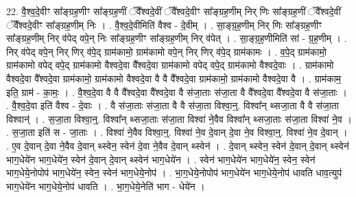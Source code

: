 \documentclass[17pt]{extarticle}
\begin{document}
22. वै॒श्व॒दे॒वीꣳ सा᳚ङ्ग्रह॒णीꣳ सा᳚ङ्ग्रह॒णीं ॅवै᳚श्वदे॒वीं ॅवै᳚श्वदे॒वीꣳ सा᳚ङ्ग्रह॒णीम् निर् णिः सा᳚ङ्ग्रह॒णीं ॅवै᳚श्वदे॒वीं ॅवै᳚श्वदे॒वीꣳ सा᳚ङ्ग्रह॒णीम् निः । . वै॒श्व॒दे॒वीमिति॑ वैश्व - दे॒वीम् । . सा॒ङ्ग्र॒ह॒णीम् निर् णिः सा᳚ङ्ग्रह॒णीꣳ सा᳚ङ्ग्रह॒णीम् निर् व॑पेद् वपे॒न् निः सा᳚ङ्ग्रह॒णीꣳ सा᳚ङ्ग्रह॒णीम् निर् व॑पेत् । . सा॒ङ्ग्र॒ह॒णीमिति॑ सां - ग्र॒ह॒णीम् । . निर् व॑पेद् वपे॒न् निर् णिर् व॑पे॒द् ग्राम॑कामो॒ ग्राम॑कामो वपे॒न् निर् णिर् व॑पे॒द् ग्राम॑कामः । . व॒पे॒द् ग्राम॑कामो॒ ग्राम॑कामो वपेद् वपे॒द् ग्राम॑कामो वैश्वदे॒वा वै᳚श्वदे॒वा ग्राम॑कामो वपेद् वपे॒द् ग्राम॑कामो वैश्वदे॒वाः । . ग्राम॑कामो वैश्वदे॒वा वै᳚श्वदे॒वा ग्राम॑कामो॒ ग्राम॑कामो वैश्वदे॒वा वै वै वै᳚श्वदे॒वा ग्राम॑कामो॒ ग्राम॑कामो वैश्वदे॒वा वै । . ग्राम॑काम॒ इति॒ ग्राम॑ - का॒मः॒ । . वै॒श्व॒दे॒वा वै वै वै᳚श्वदे॒वा वै᳚श्वदे॒वा वै स॑जा॒ताः स॑जा॒ता वै वै᳚श्वदे॒वा वै᳚श्वदे॒वा वै स॑जा॒ताः । . वै॒श्व॒दे॒वा इति॑ वैश्व - दे॒वाः । . वै स॑जा॒ताः स॑जा॒ता वै वै स॑जा॒ता विश्वा॒न्॒. विश्वा᳚न् थ्सजा॒ता वै वै स॑जा॒ता विश्वान्॑ । . स॒जा॒ता विश्वा॒न्॒. विश्वा᳚न् थ्सजा॒ताः स॑जा॒ता विश्वा॑ ने॒वैव विश्वा᳚न् थ्सजा॒ताः स॑जा॒ता विश्वा॑ ने॒व । . स॒जा॒ता इति॑ स - जा॒ताः । . विश्वा॑ ने॒वैव विश्वा॒न्॒. विश्वा॑ ने॒व दे॒वान् दे॒वा ने॒व विश्वा॒न्॒. विश्वा॑ ने॒व दे॒वान् । . ए॒व दे॒वान् दे॒वा ने॒वैव दे॒वान् थ्स्वेन॒ स्वेन॑ दे॒वा ने॒वैव दे॒वान् थ्स्वेन॑ । . दे॒वान् थ्स्वेन॒ स्वेन॑ दे॒वान् दे॒वान् थ्स्वेन॑ भाग॒धेये॑न भाग॒धेये॑न॒ स्वेन॑ दे॒वान् दे॒वान् थ्स्वेन॑ भाग॒धेये॑न । . स्वेन॑ भाग॒धेये॑न भाग॒धेये॑न॒ स्वेन॒ स्वेन॑ भाग॒धेये॒नोपोप॑ भाग॒धेये॑न॒ स्वेन॒ स्वेन॑ भाग॒धेये॒नोप॑ । . भा॒ग॒धेये॒नोपोप॑ भाग॒धेये॑न भाग॒धेये॒नोप॑ धावति धाव॒त्युप॑ भाग॒धेये॑न भाग॒धेये॒नोप॑ धावति । . भा॒ग॒धेये॒नेति॑ भाग - धेये॑न । \newline
\end{document}
